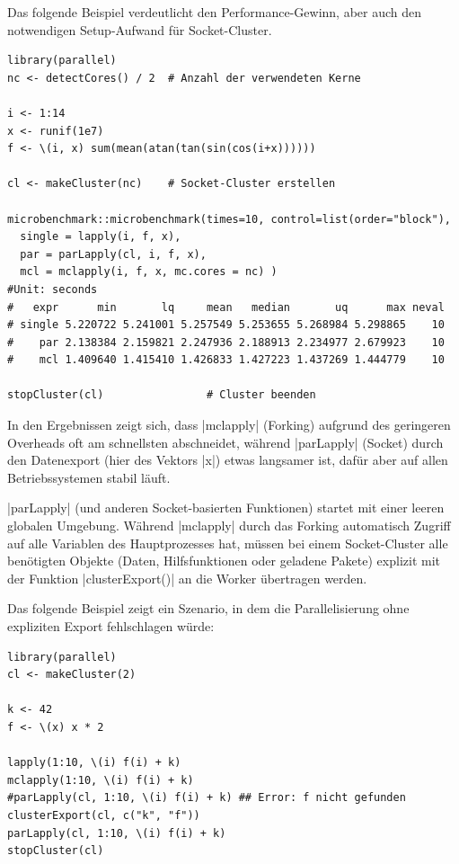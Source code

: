 \documentclass[10pt,twocolumn]{scrartcl}
\renewcommand{\lstinline}{\mycoloredinline}
\begin{document}
Das folgende Beispiel verdeutlicht den Performance-Gewinn, aber auch den notwendigen Setup-Aufwand für Socket-Cluster.

\begin{lstlisting}[basicstyle=\fontsize{9.3pt}{9.7pt}\selectfont\ttfamily]
library(parallel)
nc <- detectCores() / 2  # Anzahl der verwendeten Kerne

i <- 1:14
x <- runif(1e7)
f <- \(i, x) sum(mean(atan(tan(sin(cos(i+x))))))

cl <- makeCluster(nc)    # Socket-Cluster erstellen

microbenchmark::microbenchmark(times=10, control=list(order="block"),
  single = lapply(i, f, x),
  par = parLapply(cl, i, f, x),
  mcl = mclapply(i, f, x, mc.cores = nc) )
#Unit: seconds
#   expr      min       lq     mean   median       uq      max neval
# single 5.220722 5.241001 5.257549 5.253655 5.268984 5.298865    10
#    par 2.138384 2.159821 2.247936 2.188913 2.234977 2.679923    10
#    mcl 1.409640 1.415410 1.426833 1.427223 1.437269 1.444779    10

stopCluster(cl)                # Cluster beenden
\end{lstlisting}

In den Ergebnissen zeigt sich, dass \lstinline|mclapply| (Forking) aufgrund des geringeren Overheads oft am schnellsten abschneidet, während \lstinline|parLapply| (Socket) durch den Datenexport (hier des Vektors \lstinline|x|) etwas langsamer ist, dafür aber auf allen Betriebssystemen stabil läuft.

\lstinline|parLapply| (und anderen Socket-basierten Funktionen) startet mit einer leeren globalen Umgebung. Während \lstinline|mclapply| durch das Forking automatisch Zugriff auf alle Variablen des Hauptprozesses hat, müssen bei einem Socket-Cluster alle benötigten Objekte (Daten, Hilfsfunktionen oder geladene Pakete) explizit mit der Funktion \lstinline|clusterExport()| an die Worker übertragen werden.

Das folgende Beispiel zeigt ein Szenario, in dem die Parallelisierung ohne expliziten Export fehlschlagen würde:

\begin{lstlisting}
library(parallel)
cl <- makeCluster(2)

k <- 42
f <- \(x) x * 2

lapply(1:10, \(i) f(i) + k)
mclapply(1:10, \(i) f(i) + k)
#parLapply(cl, 1:10, \(i) f(i) + k) ## Error: f nicht gefunden
clusterExport(cl, c("k", "f"))
parLapply(cl, 1:10, \(i) f(i) + k)
stopCluster(cl)
\end{lstlisting}
\end{document}
